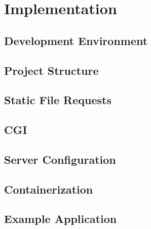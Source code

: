 \section*{Implementation}

\subsection*{Development Environment}


\subsection*{Project Structure} %

\subsection{Static File Requests}

\subsection*{CGI}

\subsection*{Server Configuration}

\subsection*{Containerization}

\subsection*{Example Application}
